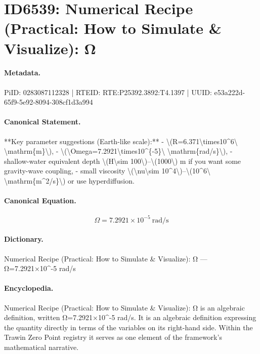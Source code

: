 \section*{ID6539: Numerical Recipe (Practical: How to Simulate \& Visualize): Ω}
\paragraph{Metadata.}
PiID: 0283087112328 | RTEID: RTE:P25392.3892:T4.1397 | UUID: e53a222d-65f9-5e92-8094-308cf1d3a994

\paragraph{Canonical Statement.}
**Key parameter suggestions (Earth-like scale):** - \textbackslash{}(R=6.371\textbackslash{}times10\textasciicircum{}6\textbackslash{} \textbackslash{}mathrm\{m\}\textbackslash{}), - \textbackslash{}(\textbackslash{}Omega=7.2921\textbackslash{}times10\textasciicircum{}\{-5\}\textbackslash{} \textbackslash{}mathrm\{rad/s\}\textbackslash{}), - shallow-water equivalent depth \textbackslash{}(H\textbackslash{}sim 100\textbackslash{})–\textbackslash{}(1000\textbackslash{}) m if you want some gravity-wave coupling, - small viscosity \textbackslash{}(\textbackslash{}nu\textbackslash{}sim 10\textasciicircum{}4\textbackslash{})–\textbackslash{}(10\textasciicircum{}6\textbackslash{} \textbackslash{}mathrm\{m\textasciicircum{}2/s\}\textbackslash{}) or use hyperdiffusion.

\paragraph{Canonical Equation.}
\[
\Omega=7.2921\times10^{-5}\ \mathrm{rad/s}
\]

\paragraph{Dictionary.}
Numerical Recipe (Practical: How to Simulate \& Visualize): Ω — Ω=7.2921×10\textasciicircum{}-5 rad/s

\paragraph{Encyclopedia.}
Numerical Recipe (Practical: How to Simulate \& Visualize): Ω is an algebraic definition, written Ω=7.2921×10\textasciicircum{}-5 rad/s. It is an algebraic definition expressing the quantity directly in terms of the variables on its right-hand side. Within the Trawin Zero Point registry it serves as one element of the framework's mathematical narrative.
